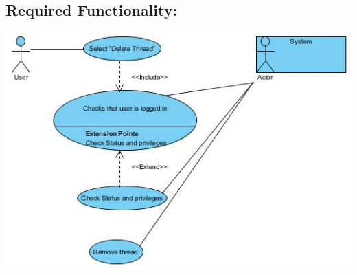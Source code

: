 \documentclass[a4paper,11pt]{article}
\begin{document}
\subsection{Required Functionality:} 
\includegraphics[width=1\linewidth]{./Images/CRUDThread/Diagrams/14.jpg}\\
\end{document}
